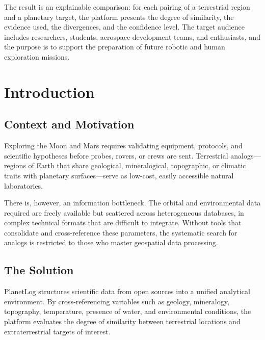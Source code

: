 \documentclass[12pt,letterpaper]{article}
\begin{document}
The result is an explainable comparison: for each pairing of a terrestrial region and a planetary target, the platform presents the degree of similarity, the evidence used, the divergences, and the confidence level. The target audience includes researchers, students, aerospace development teams, and enthusiasts, and the purpose is to support the preparation of future robotic and human exploration missions.

\vspace{1em}
\tableofcontents
\clearpage
{}
\setcounter{page}{1}

\section{Introduction}

\subsection{Context and Motivation}

Exploring the Moon and Mars requires validating equipment, protocols, and scientific hypotheses before probes, rovers, or crews are sent. Terrestrial analogs---regions of Earth that share geological, mineralogical, topographic, or climatic traits with planetary surfaces---serve as low-cost, easily accessible natural laboratories.

There is, however, an information bottleneck. The orbital and environmental data required are freely available but scattered across heterogeneous databases, in complex technical formats that are difficult to integrate. Without tools that consolidate and cross-reference these parameters, the systematic search for analogs is restricted to those who master geospatial data processing.

\subsection{The Solution}

PlanetLog structures scientific data from open sources into a unified analytical environment. By cross-referencing variables such as geology, mineralogy, topography, temperature, presence of water, and environmental conditions, the platform evaluates the degree of similarity between terrestrial locations and extraterrestrial targets of interest.
\end{document}
